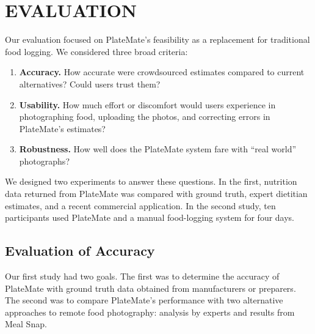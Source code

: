 \section{EVALUATION}

Our evaluation focused on PlateMate's feasibility as a replacement for traditional food logging.  We considered three broad criteria:
\vspace*{-2mm}
\begin{enumerate}
\item \textbf{Accuracy.} How accurate were crowdsourced estimates compared to current alternatives? Could users trust them?
\item \textbf{Usability.} How much effort or discomfort would users experience in photographing food, uploading the photos, and correcting errors in PlateMate's estimates?
\item \textbf{Robustness.} How well does the PlateMate system fare with ``real world'' photographs?
\end{enumerate}
\vspace*{-2mm}
We designed two experiments to answer these questions.  In the first, nutrition data returned from PlateMate was compared with ground truth, expert dietitian estimates, and a recent commercial application.  In the second study, ten participants used PlateMate and a manual food-logging system for four days.

\subsection{Evaluation of Accuracy}

Our first study had two goals. The first was to determine the accuracy of PlateMate with ground truth data obtained from manufacturers or preparers. The second was to compare PlateMate's performance with two alternative approaches to remote food photography: analysis by experts and results from Meal Snap.  

